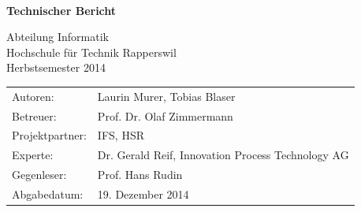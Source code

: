 \begin{titlepage}
\begin{center}
		{\fontsize{28}{40} \selectfont \textbf{\project} \\}
		\vspace{0.25cm}
		{\fontsize{22}{40} \selectfont \textbf{Technischer Bericht} \\[10mm]}
	
		{\fontsize{18}{20} \selectfont 
			Abteilung Informatik\\
			Hochschule für Technik Rapperswil \\
				
			{\fontsize{14}{16} \selectfont Herbstsemester 2014\\}
		}
		
	\end{center}
	
	\vspace*{1.5cm}
	\begin{minipage}[b]{0.4\textwidth}
		\begin{flushleft}
			\begin{tabular}{ll}  
				Autoren: & Laurin Murer, Tobias Blaser \\ 
				Betreuer: & Prof. Dr. Olaf Zimmermann\\ 
				Projektpartner: & IFS, HSR\\
				Experte: & Dr. Gerald Reif, Innovation Process Technology AG\\
				Gegenleser: & Prof. Hans Rudin\\
				Abgabedatum: & 19. Dezember 2014\\
			\end{tabular}
		\end{flushleft}
	\end{minipage}	

\end{titlepage}